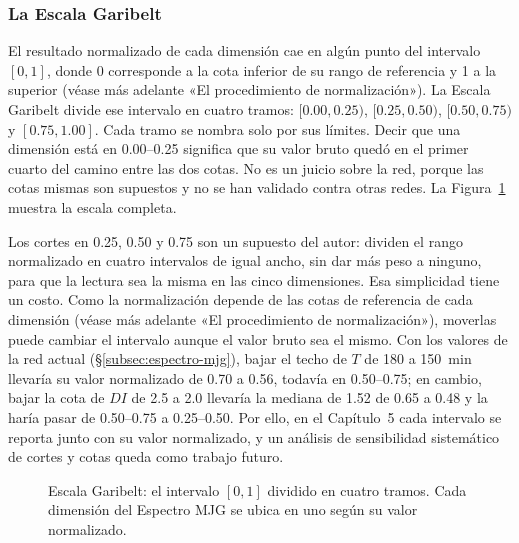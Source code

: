 
\subsubsection{La Escala Garibelt}
\label{subsubsec:garibelt-escala}

El resultado normalizado de cada dimensión cae en algún punto del intervalo
$[0, 1]$, donde 0 corresponde a la cota inferior de su rango de referencia y 1
a la superior (véase más adelante «El procedimiento de normalización»). La Escala Garibelt
divide ese intervalo en cuatro tramos: $[0.00, 0.25)$, $[0.25, 0.50)$,
$[0.50, 0.75)$ y $[0.75, 1.00]$. Cada tramo se nombra solo por sus límites.
Decir que una dimensión está en 0.00--0.25 significa que su valor bruto quedó
en el primer cuarto del camino entre las dos cotas. No es un juicio sobre la
red, porque las cotas mismas son supuestos y no se han validado contra otras
redes. La Figura~\ref{fig:escala-garibelt-barra} muestra la escala completa.

Los cortes en 0.25, 0.50 y 0.75 son un supuesto del autor: dividen el rango
normalizado en cuatro intervalos de igual ancho, sin dar más peso a ninguno,
para que la lectura sea la misma en las cinco dimensiones. Esa simplicidad
tiene un costo. Como la normalización depende de las cotas de referencia de
cada dimensión (véase más adelante «El procedimiento de normalización»), moverlas puede
cambiar el intervalo aunque el valor bruto sea el mismo. Con los valores de la
red actual (§\ref{subsec:espectro-mjg}), bajar el techo de $T$ de 180 a
150~min llevaría su valor normalizado de 0.70 a 0.56, todavía en 0.50--0.75;
en cambio, bajar la cota de $DI$ de 2.5 a 2.0 llevaría la mediana de 1.52 de
0.65 a 0.48 y la haría pasar de 0.50--0.75 a 0.25--0.50. Por ello, en el
Capítulo~5 cada intervalo se reporta junto con su valor normalizado, y un
análisis de sensibilidad sistemático de cortes y cotas queda como trabajo
futuro.

\begin{figure}[htbp]
\centering

\caption[Escala Garibelt: cuatro intervalos del valor normalizado]{%
    Escala Garibelt: el intervalo $[0,1]$ dividido en cuatro tramos. Cada
    dimensión del Espectro MJG se ubica en uno según su valor normalizado.}
\label{fig:escala-garibelt-barra}
\end{figure}

